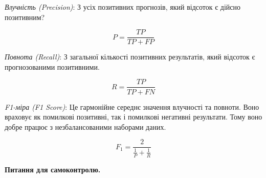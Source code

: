 \textit{Влучність (Precision)}: З усіх позитивних прогнозів, який відсоток є дійсно позитивним?

$$P = \frac{TP}{TP + FP}$$

\textit{Повнота (Recall)}: З загальної кількості позитивних результатів, який відсоток є прогнозованими позитивними.

$$R = \frac{TP}{TP + FN}$$

\textit{F1-міра (F1 Score)}: Це гармонійне середнє значення влучності та повноти. Воно враховує як помилкові позитивні, так і помилкові негативні результати. Тому воно добре працює з незбалансованими наборами даних.

$$F_{1} = \frac{2}{\frac{1}{P} + \frac{1}{R}}$$



 \textbf{Питання для самоконтролю.}

